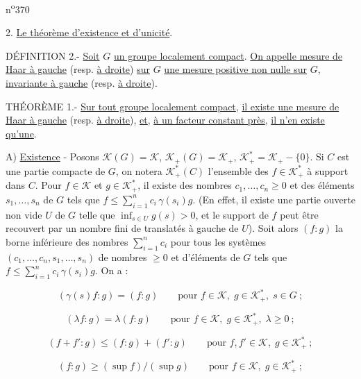 
 \hfill n\textsuperscript{o}370

2. \uline{Le théorème d'existence et d'unicité}.


DÉFINITION 2.- \uline{Soit} $G$\handwritten{\unsure{$\checkmark$}} \uline{un groupe localement compact}. \uline{On appelle mesure de Haar à gauche} (resp. \uline{à droite}) \uline{sur} $G$ \uline{une mesure positive non nulle sur} $G$, \uline{invariante à gauche} (resp. \uline{à droite}).

THÉORÈME 1.- \uline{Sur tout groupe localement compact}, \uline{il existe une mesure de Haar à gauche} (resp. \uline{à droite}), \uline{et}, \uline{à un facteur constant près}, \uline{il n'en existe qu'une}.

A) \uline{Existence} - Posons $\mathcal{K}(G)=\mathcal{K}$, $\mathcal{K}_+(G)=\mathcal{K}_+$, $\mathcal{K}_+^*=\mathcal{K}_+-\{0\}$. Si $C$ est une partie compacte de $G$, on notera $\mathcal{K}_+^*(C)$ l'ensemble des $f\in\mathcal{K}_+^*$ à support dans $C$. Pour $f\in\mathcal{K}$ et $g\in\mathcal{K}_+^*$, il existe des nombres $c_1,\ldots,c_n\geq0$ et des éléments $s_1,\ldots,s_n$ de $G$ tels que $f\leq\sum\limits_{i=1}^n c_i\,\gamma(s_i)g$. (En effet, il existe une partie ouverte non vide $U$ de $G$ telle que $\inf_{s\in U}g(s)>0$, et le support de $f$ peut être recouvert par un nombre fini de translatés à gauche de $U$). Soit alors $(f:g)$ la borne inférieure des nombres $\sum\limits_{i=1}^n c_i$ pour tous les systèmes $(c_1,\ldots,c_n,s_1,\ldots,s_n)$ de nombres $\geq0$ et d'éléments de $G$ tels que $f\leq\sum\limits_{i=1}^n c_i\,\gamma(s_i)g$. On a :

\[
(\gamma(s)f:g)=(f:g)\qquad\text{pour }f\in\mathcal{K},\;g\in\mathcal{K}_+^*,\;s\in G\ ; \tag*{(i)}
\]

\[
(\lambda f:g)=\lambda(f:g)\qquad\text{pour }f\in\mathcal{K},\;g\in\mathcal{K}_+^*,\;\lambda\geq0\ ; \tag*{(ii)}
\]

\[
(f+f':g)\leq(f:g)+(f':g)\qquad\text{pour }f,f'\in\mathcal{K},\;g\in\mathcal{K}_+^*\ ; \tag*{(iii)}
\]

\[
(f:g)\geq(\sup f)/(\sup g)\qquad\text{pour }f\in\mathcal{K},\;g\in\mathcal{K}_+^*\ ; \tag*{(iv)}
\]

